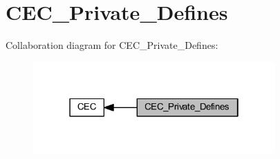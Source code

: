 \hypertarget{group___c_e_c___private___defines}{}\section{C\+E\+C\+\_\+\+Private\+\_\+\+Defines}
\label{group___c_e_c___private___defines}
Collaboration diagram for C\+E\+C\+\_\+\+Private\+\_\+\+Defines\+:
\nopagebreak
\begin{figure}[H]
\begin{center}
\leavevmode
\includegraphics[width=262pt]{group___c_e_c___private___defines}
\end{center}
\end{figure}
